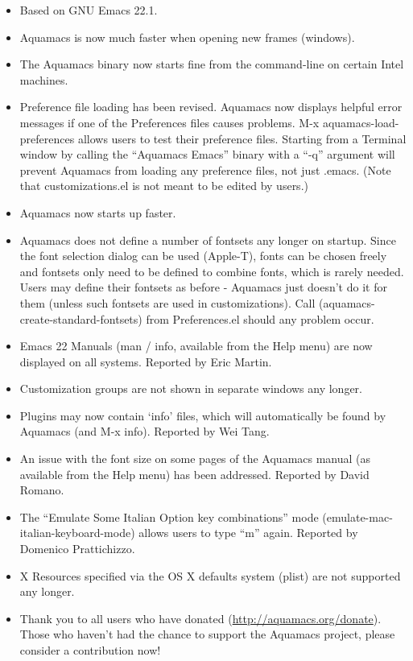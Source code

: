 \begin{itemize}
	
\item Based on GNU Emacs 22.1.

\item Aquamacs is now much faster when opening new frames (windows).

\item The Aquamacs binary now starts fine from the command-line on certain Intel machines.

\item Preference file loading has been revised.  Aquamacs now
  displays helpful error messages if one of the Preferences files
  causes problems. M-x aquamacs-load-preferences allows users to test
  their preference files. Starting from a Terminal window by calling
  the ``Aquamacs Emacs'' binary with a ``-q'' argument will prevent
  Aquamacs from loading any preference files, not just .emacs.
(Note that customizations.el is not meant to be edited by users.)

\item Aquamacs now starts up faster.

\item Aquamacs does not define a number of fontsets any longer on
  startup. Since the font selection dialog can be used (Apple-T),
  fonts can be chosen freely and fontsets only need to be defined to
  combine fonts, which is rarely needed. Users may define their
  fontsets as before - Aquamacs just doesn't do it for them (unless
  such fontsets are used in customizations).
  Call (aquamacs-create-standard-fontsets) from Preferences.el should
  any problem occur.

\item Emacs 22 Manuals (man / info, available from the Help menu)  are
  now displayed on all systems.
  Reported by Eric Martin.

\item Customization groups are not shown in separate windows any longer.

\item Plugins may now contain `info' files, which will automatically
  be found by Aquamacs (and M-x info).
Reported by Wei Tang.

\item An issue with the font size on some pages of the Aquamacs manual
  (as available from the Help menu) has been addressed.
Reported by David Romano.
 
\item The ``Emulate Some Italian Option key combinations'' mode   (emulate-mac-italian-keyboard-mode) allows users to type ``m'' again.   Reported by Domenico Prattichizzo.

\item X Resources specified via the OS X defaults system (plist) are
  not supported any longer.

\item Thank you to all users who have donated
        (\url{http://aquamacs.org/donate}). Those who haven't had the
        chance to support the Aquamacs project, please consider a
        contribution now!

\end{itemize}
	

